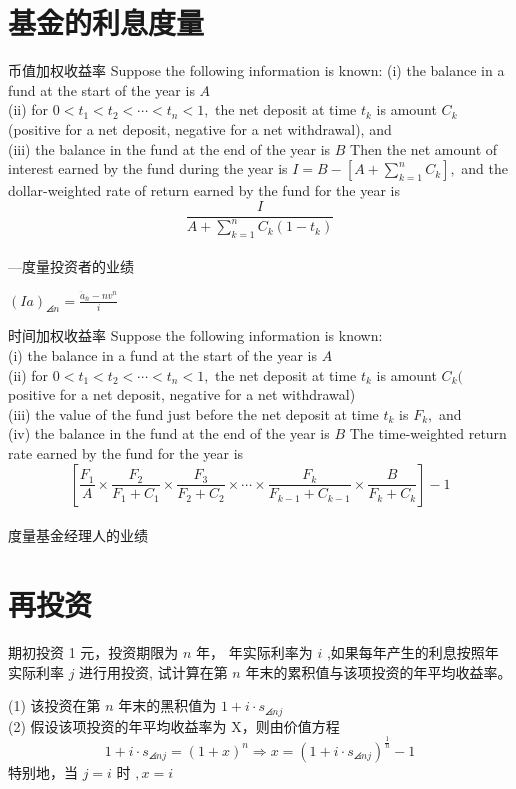 \section{基金的利息度量}
\begin{definition}{币值加权收益率}
\noindent	Suppose the following information is known:
	(i) the balance in a fund at the start of the year is $A$ \\
	(ii) for $0<t_{1}<t_{2}<\cdots<t_{n}<1,$ the net deposit at time $t_{k}$ is amount $C_{k}$ (positive for a net deposit, negative for a net withdrawal), and \\
	(iii) the balance in the fund at the end of the year is $B$
	Then the net amount of interest earned by the fund during the year is $I=B-\left[A+\sum_{k=1}^{n} C_{k}\right],$ and the dollar-weighted rate of return earned by the fund for the year is
	\[
	\frac{I}{A+\sum_{k=1}^{n} C_{k}\left(1-t_{k}\right)}
	\]
	\\---度量投资者的业绩
\end{definition}
\begin{remark}
	$(Ia)_{\angles{n}}=\frac{\ddot{a}_{\bar{n}}-n v^{n}}{i}$
\end{remark}
\begin{definition}{时间加权收益率}
\noinent Suppose the following information is known:\\
	(i) the balance in a fund at the start of the year is $A$\\
	(ii) for $0<t_{1}<t_{2}<\cdots<t_{n}<1,$ the net deposit at time $t_{k}$ is amount $C_{k}($ positive for a net deposit, negative for a net withdrawal)\\
	(iii) the value of the fund just before the net deposit at time $t_{k}$ is $F_{k},$ and\\
	(iv) the balance in the fund at the end of the year is $B$
	The time-weighted return rate earned by the fund for the year is
	\[
	\left[\frac{F_{1}}{A} \times \frac{F_{2}}{F_{1}+C_{1}} \times \frac{F_{3}}{F_{2}+C_{2}} \times \cdots \times \frac{F_{k}}{F_{k-1}+C_{k-1}} \times \frac{B}{F_{k}+C_{k}}\right]-1
	\]	
	\\度量基金经理人的业绩
\end{definition}	
\section{再投资}
\begin{example}
期初投资 1 元，投资期限为 $n$ 年， 年实际利率为 $i$ ,如果每年产生的利息按照年实际利率 $j$ 进行用投资, 试计算在第 $n$ 年末的累积值与该项投资的年平均收益率。
\end{example}
\begin{solution}
(1) 该投资在第 $n$ 年末的黑积值为 $1+i \cdot s_{\angles{n} j}$\\
(2) 假设该项投资的年平均收益率为 X，则由价值方程
\[
1+i \cdot s_{\angles{n} j}=(1+x)^{n} \Longrightarrow x=\left(1+i \cdot s_{\angles{n} j}\right)^{\frac{1}{n}}-1
\]
特别地，当 $j=i$ 时 $, x=i$
\end{solution}
